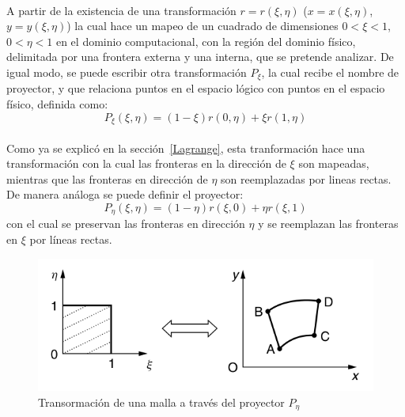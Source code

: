 \documentclass[letterpaper, openright, 12pt]{book}
\begin{document}
    \paragraph*{}
    A partir de la existencia de una transformación $r = r(\xi, \eta)$
    ($x = x(\xi, \eta)$, $y = y(\xi, \eta)$) la cual hace un mapeo de un
    cuadrado de dimensiones $0 < \xi < 1$, $0 < \eta < 1$ en el dominio
    computacional, con la región del dominio físico, delimitada por una
    frontera externa y una interna, que se pretende analizar.
    De igual modo, se puede escribir otra transformación $P_{\xi}$,
    la cual recibe el nombre de proyector, y que relaciona puntos en el
    espacio lógico con puntos en el espacio físico, definida como:
    \begin{equation}
        P_{\xi}(\xi, \eta) = (1 - \xi)r(0, \eta) + \xi r(1, \eta)
    \end{equation}

    \paragraph*{}
    Como ya se explicó en la sección~\ref{Lagrange}, esta tranformación hace
    una transformación con la cual las fronteras en la dirección de $\xi$
    son mapeadas, mientras que las fronteras en dirección de $\eta$ son
    reemplazadas por lineas rectas. De manera análoga se puede definir el
    proyector:
    \begin{equation}
        P_{\eta}(\xi, \eta) = (1 - \eta)r(\xi, 0) + \eta r(\xi, 1)
    \end{equation}
    con el cual se preservan las fronteras en dirección $\eta$ y se
    reemplazan las fronteras en $\xi$ por líneas rectas.
    \begin{figure}[htbp!]
        \centering
        \includegraphics[keepaspectratio, width=120mm]{./img/mapeo_eta}
        \caption[Transformación de malla por $P_{\eta}$]{Transormación de
        una malla a través del proyector $P_{\eta}$ \cite{farrashkhalvat}}
        \label{fig:mapeo_eta}
    \end{figure}
\end{document}
